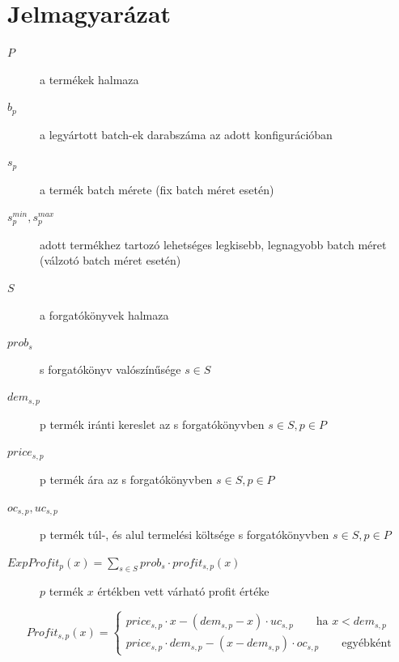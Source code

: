 \appendix
\chapter{Jelmagyarázat}
\begin{description}
\item[$P$]  a termékek halmaza
\item[$b_p$]  a legyártott batch-ek darabszáma az adott konfigurációban
\item[$s_p$]  a termék batch mérete (fix batch méret esetén)
\item[$s_p^{min},s_p^{max}$]  adott termékhez tartozó lehetséges legkisebb, legnagyobb batch méret (válzotó batch méret esetén)
\item[$S$]  a forgatókönyvek halmaza
\item[$prob_s$]  s forgatókönyv valószínűsége $s	\in S$
\item[$dem_{s,p}$]  p termék iránti kereslet az s forgatókönyvben $s	\in S, p	\in P$
\item[$price_{s,p}$]  p termék ára az s forgatókönyvben $s	\in S, p	\in P$
\item[$oc_{s,p}, uc_{s,p}$]  p termék túl-, és alul termelési költsége s forgatókönyvben $s	\in S, p	\in P$
\item[$ExpProfit_p(x)=\sum_{s \in S}prob_s \cdot profit_{s,p}(x)$]  $p$ termék $x$ értékben vett várható profit értéke
\end {description}
\begin{equation*}
Profit_{s,p}(x)= \begin{cases}
            price_{s,p}\cdot x-(dem_{s,p}-x) \cdot uc_{s,p}\qquad \text{ha } x<dem_{s,p} \\
            price_{s,p} \cdot dem_{s,p}-(x-dem_{s,p}) \cdot oc_{s,p}\qquad \text{egyébként}
       \end{cases}
\end{equation*}

